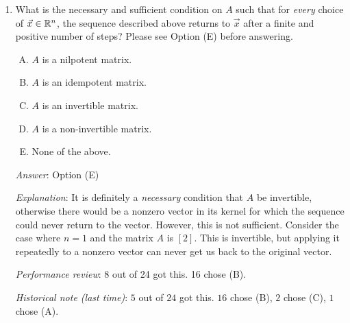 \documentclass[10pt]{amsart}
\begin{document}
\begin{enumerate}
  {\em Answer}: Option (D)

  {\em Explanation}: Suppose $\vec{x}$ is a nonzero vector and $r$ is
  the smallest positive integer such that the vector $A^r\vec{x}$ is
  the zero vector. Then, $A(A^{r-1}\vec{x}) = 0$ but $A^{r-1}\vec{x}
  \ne 0$, so that $A^{r-1}\vec{x}$ is a nonzero vector in the kernel
  of $T$. Thus, $T$ has a nonzero kernel, so it must be
  non-invertible, hence $A$ must be a non-invertible matrix.

  Conversely, if $A$ is non-invertible, there is a nonzero vector, say
  $\vec{x}$, in the kernel of $A$. This vector can be used.

  {\em Performance review}: 11 out of 24 got this. 7 chose (A), 5
  chose (E), 1 chose (B).

  {\em Historical note (last time)}: $5$ out of $24$ got this. $15$ chose (A),
  $3$ chose (C), and $1$ chose (E).

\item What is the necessary and sufficient condition on $A$ such that
  for {\em every} choice of $\vec{x} \in \mathbb{R}^n$, the sequence described
  above returns to $\vec{x}$ after a finite and positive number of
  steps? Please see Option (E) before answering.

  \begin{enumerate}[(A)]
  \item $A$ is a nilpotent matrix.
  \item $A$ is an idempotent matrix.
  \item $A$ is an invertible matrix.
  \item $A$ is a non-invertible matrix.
  \item None of the above.
  \end{enumerate}

  {\em Answer}: Option (E)

  {\em Explanation}: It is definitely a {\em necessary} condition that
  $A$ be invertible, otherwise there would be a nonzero vector in its
  kernel for which the sequence could never return to the
  vector. However, this is not sufficient. Consider the case where $n
  = 1$ and the matrix $A$ is $[2]$. This is invertible, but applying
  it repeatedly to a nonzero vector can never get us back to the
  original vector.

  {\em Performance review}: 8 out of 24 got this. 16 chose (B).

  {\em Historical note (last time)}: $5$ out of $24$ got this. $16$ chose (B),
  $2$ chose (C), $1$ chose (A).


\end{enumerate}
\end{document}
